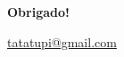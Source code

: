 \documentclass{beamer}
\renewcommand{\(}{\left(}
\renewcommand{\)}{\right)}
\renewcommand{\[}{\left[}
\renewcommand{\]}{\right]}
\begin{document}


{
%
\begin{frame}[plain]
\centering
\Large
\textbf{Obrigado!}

\vspace{1cm}
\normalsize
\href{tatatupi@gmail.com}{tatatupi@gmail.com}

\end{frame}
\addtocounter{framenumber}{-1}

}
\end{document}
